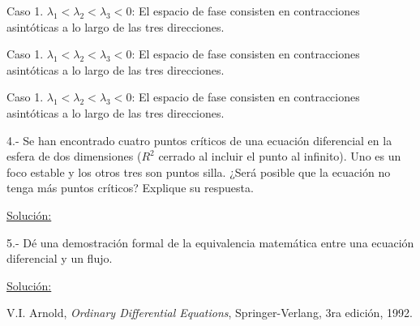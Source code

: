 \documentclass[a4paper,10pt]{article}
\begin{document}
Caso 1. $\lambda_1 < \lambda_2 < \lambda_3 < 0$: El espacio de fase consisten en contracciones asintóticas
a lo largo de las tres direcciones.


Caso 1. $\lambda_1 < \lambda_2 < \lambda_3 < 0$: El espacio de fase consisten en contracciones asintóticas
a lo largo de las tres direcciones.


Caso 1. $\lambda_1 < \lambda_2 < \lambda_3 < 0$: El espacio de fase consisten en contracciones asintóticas
a lo largo de las tres direcciones.


4.- Se han encontrado cuatro puntos críticos de una ecuación diferencial en la esfera
de dos dimensiones ($R^2$ cerrado al incluir el punto al infinito). Uno es un foco
estable y los otros tres son puntos silla. ¿Será posible que la ecuación no tenga
más puntos críticos? Explique su respuesta.


\vspace{.3cm}

\underline{Solución:}

\vspace{.3cm}

5.- Dé una demostración formal de la equivalencia matemática entre una ecuación
diferencial y un flujo.

\vspace{.3cm}

\underline{Solución:}

\vspace{.3cm}


\begin{thebibliography}{10}
 V.I. Arnold, \emph{Ordinary Differential Equations}, Springer-Verlang,
 3ra edición, 1992.
\end{thebibliography}
\end{document}
